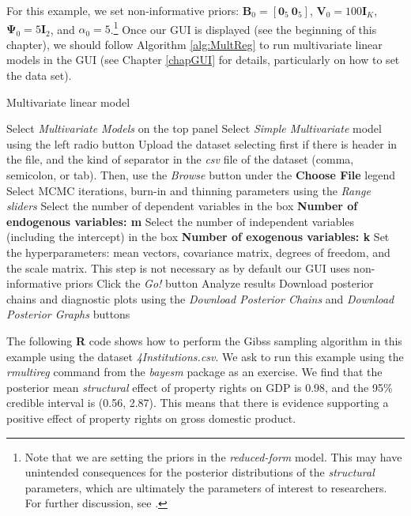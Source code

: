 For this example, we set non-informative priors: $\bm{B}_0 = \left[\bm{0}_5 \ \bm{0}_5\right]$, $\bm{V}_0 = 100 \bm{I}_K$, $\bm{\Psi}_0 = 5 \bm{I}_2$, and $\alpha_0 = 5$.\footnote{Note that we are setting the priors in the \textit{reduced-form} model. This may have unintended consequences for the posterior distributions of the \textit{structural} parameters, which are ultimately the parameters of interest to researchers. For further discussion, see \cite[p.~302]{koop2003bayesian}.} Once our GUI is displayed (see the beginning of this chapter), we should follow Algorithm \ref{alg:MultReg} to run multivariate linear models in the GUI (see Chapter \ref{chapGUI} for details, particularly on how to set the data set).
\begin{algorithm}[h!]
	\caption{Multivariate linear model}\label{alg:MultReg}
	\begin{algorithmic}[1]  		 			
		\State Select \textit{Multivariate Models} on the top panel
		\State Select \textit{Simple Multivariate} model using the left radio button
		\State Upload the dataset selecting first if there is header in the file, and the kind of separator in the \textit{csv} file of the dataset (comma, semicolon, or tab). Then, use the \textit{Browse} button under the \textbf{Choose File} legend
		\State Select MCMC iterations, burn-in and thinning parameters using the \textit{Range sliders}
		\State Select the number of dependent variables in the box \textbf{Number of endogenous variables: m}
		\State Select the number of independent variables (including the intercept) in the box \textbf{Number of exogenous variables: k}
		\State Set the hyperparameters: mean vectors, covariance matrix, degrees of freedom, and the scale matrix. This step is not necessary as by default our GUI uses non-informative priors
		\State Click the \textit{Go!} button
		\State Analyze results
		\State Download posterior chains and diagnostic plots using the \textit{Download Posterior Chains} and \textit{Download Posterior Graphs} buttons
	\end{algorithmic} 
\end{algorithm}

The following \textbf{R} code shows how to perform the Gibss sampling algorithm in this example using the dataset \textit{4Institutions.csv}. We ask to run this example using the \textit{rmultireg} command from the \textit{bayesm} package as an exercise. We find that the posterior mean \textit{structural} effect of property rights on GDP is 0.98, and the 95\% credible interval is (0.56, 2.87). This means that there is evidence supporting a positive effect of property rights on gross domestic product. 

